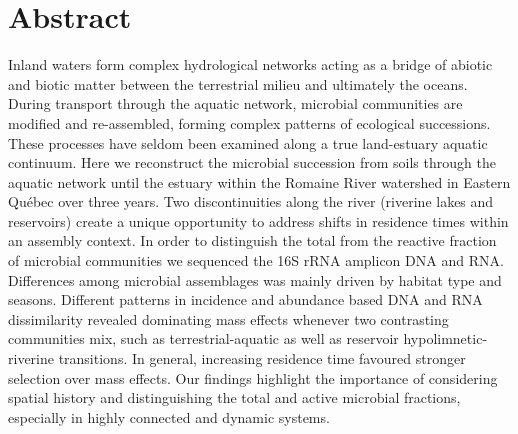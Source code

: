 \documentclass[12pt,a4paper]{article} %
\begin{document}
\section*{Abstract} %
Inland waters form complex hydrological networks acting as a bridge of abiotic and biotic matter between the terrestrial milieu and ultimately the oceans. During transport through the aquatic network, microbial communities are modified and re-assembled, forming complex patterns of ecological successions. These processes have seldom been examined along a true land-estuary aquatic continuum. Here we reconstruct the microbial succession from soils through the aquatic network until the estuary within the Romaine River watershed in Eastern Québec over three years. Two discontinuities along the river (riverine lakes and reservoirs) create a unique opportunity to address shifts in residence times within an assembly context. In order to distinguish the total from the reactive fraction of microbial communities we sequenced the 16S rRNA amplicon DNA and RNA. Differences among microbial assemblages was mainly driven by habitat type and seasons. Different patterns in incidence and abundance based DNA and RNA dissimilarity revealed dominating mass effects whenever two contrasting communities mix, such as terrestrial-aquatic as well as reservoir hypolimnetic-riverine transitions. In general, increasing residence time favoured stronger selection over mass effects. Our findings highlight the importance of considering spatial history and distinguishing the total and active microbial fractions, especially in highly connected and dynamic systems.


\setlength{\parindent}{1cm}
\end{document}
